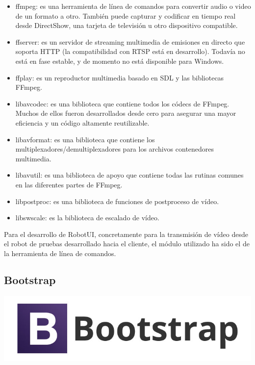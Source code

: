 \begin{itemize}
 \item ffmpeg: es una herramienta de línea de comandos para convertir audio o video de un formato a otro. También puede capturar y codificar en tiempo real desde DirectShow, una tarjeta de televisión u otro dispositivo compatible.
 \item ffserver: es un servidor de streaming multimedia de emisiones en directo que soporta HTTP (la compatibilidad con RTSP está en desarrollo). Todavía no está en fase estable, y de momento no está disponible para Windows.
 \item ffplay: es un reproductor multimedia basado en SDL y las bibliotecas FFmpeg.
 \item libavcodec: es una biblioteca que contiene todos los códecs de FFmpeg. Muchos de ellos fueron desarrollados desde cero para asegurar una mayor eficiencia y un código altamente reutilizable.
 \item libavformat: es una biblioteca que contiene los multiplexadores/demultiplexadores para los archivos contenedores multimedia.
 \item libavutil: es una biblioteca de apoyo que contiene todas las rutinas comunes en las diferentes partes de FFmpeg.
 \item libpostproc: es una biblioteca de funciones de postproceso de vídeo.
 \item libswscale: es la biblioteca de escalado de vídeo.
\end{itemize}

Para el desarrollo de RobotUI, concretamente para la transmisión de vídeo desde el robot de pruebas desarrollado hacia el cliente, el módulo utilizado ha sido el de la herramienta de línea de comandos.


\subsection{Bootstrap}


\begin{center}
\includegraphics[scale=0.3]{imagenes/bootstrap-logo.jpg}
\end{center}

